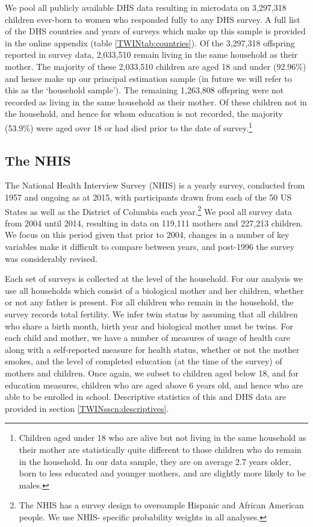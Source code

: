 \documentclass[a4paper, 11pt]{article}
\theoremstyle{plain}
\begin{document}
We pool all publicly available DHS data resulting in microdata on 3,297,318 
children ever-born to women who responded fully to any DHS survey. A full list of 
the DHS countries and years of surveys which make up this sample is provided in
the online appendix (table \ref{TWINtab:countries}).  Of the 3,297,318 offspring 
reported in survey data, 2,033,510 remain living in the same household as their 
mother.  The majority of these 2,033,510 children are aged 18 and under (92.96\%) 
and hence make up our principal estimation sample (in future we will refer to this 
as the `household sample'). The remaining 1,263,808 offspring were not recorded as 
living in the same household as their mother.  Of these children not in the 
household, and hence for whom education is not recorded, the majority (53.9\%) 
were aged over 18 or had died prior to the date of survey.\footnote{Children aged 
under 18 who are alive but not living in the same household as their mother are 
statistically quite different to those children who do remain in the household. 
In our data sample, they are on average 2.7 years older, born to less educated 
and younger mothers, and are slightly more likely to be males.}

\subsection{The NHIS}
The National Health Interview Survey (NHIS) is a yearly survey, conducted from 
1957 and ongoing as at 2015, with participants drawn from each of the 50 US 
States as well as the District of Columbia each year.\footnote{The NHIS has a
survey design to oversample Hispanic and African American people.  We use NHIS-%
specific probability weights in all analyses.}  We pool all survey data from 
2004 until 2014, resulting in data on 119,111 mothers and 227,213 children. We 
focus on this period given that prior to 2004, changes in a number of key 
variables make it difficult to compare between years, and post-1996 the survey 
was considerably revised.

Each set of surveys is collected at the level of the household.  For our 
analysis we use all households which consist of a biological mother and her 
children, whether or not any father is present.  For all children who remain in
the household, the survey records total fertility.  We infer twin status by
assuming that all children who share a birth month, birth year and biological
mother must be twins.  For each child and mother, we have a number of measures
of usage of health care along with a self-reported measure for health status, 
whether or not the mother smokes, and the level of completed education (at the 
time of the survey) of mothers and children.  Once again, we subset to children
aged below 18, and for education measures, children who are aged above 6 years
old, and hence who are able to be enrolled in school.  Descriptive statistics of
this and DHS data are provided in section \ref{TWINsscn:descriptives}.
\end{document}
